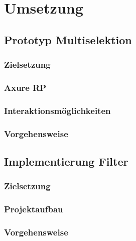 \chapter{Umsetzung}\label{ch:experiments}

\section {Prototyp Multiselektion}
\subsection{Zielsetzung}
\subsection {Axure RP}
\subsection{Interaktionsmöglichkeiten}
\subsection{Vorgehensweise}

\section {Implementierung Filter}
\subsection {Zielsetzung}
\subsection {Projektaufbau}
\subsection {Vorgehensweise}


